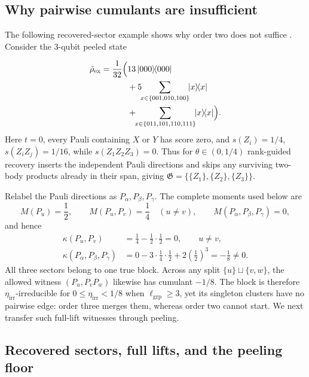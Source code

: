 \documentclass[
  aps,
  prx,
  reprint,
  superscriptaddress,
  amsmath,
  amssymb,
  nofootinbib,
  longbibliography
]{revtex4-2}
\begin{document}
\subsection{Why pairwise cumulants are insufficient}
\label{sec:supp-pairwise-cumulants-insufficient}
The following recovered-sector example shows why order two does not suffice
\cite{smith2020multivariateKstatistics}.  Consider the $3$-qubit peeled
state

\begin{align}
\tilde\rho_{\mathrm{ex}}
=
\frac{1}{32}
\Bigl(
&13\,|000\rangle\!\langle 000|
\notag\\
&+
5\!\!\sum_{x\in\{001,010,100\}}\!\!|x\rangle\!\langle x|
\notag\\
&+
\!\!\sum_{x\in\{011,101,110,111\}}\!\!|x\rangle\!\langle x|
\Bigr).
\label{eq:supp-example-state-three-sectors}
\end{align}
Here $t=0$, every Pauli containing $X$ or $Y$ has score zero, and
$s(Z_i)=1/4$, $s(Z_iZ_j)=1/16$, while $s(Z_1Z_2Z_3)=0$.  Thus for
$\theta\in(0,1/4)$ rank-guided recovery inserts the independent Pauli directions and
skips any surviving two-body products already in their span, giving
$\mathfrak G=\{\{Z_1\},\{Z_2\},\{Z_3\}\}$.

Relabel the Pauli directions as $P_\alpha,P_\beta,P_\gamma$.  The complete moments used
below are
\begin{equation}
M(P_u)=\frac12,
\qquad
M(P_u,P_v)=\frac14\quad(u\ne v),
\qquad
M(P_\alpha,P_\beta,P_\gamma)=0,
\end{equation}
and hence
\begin{align*}
\kappa(P_u,P_v)
&=\frac14-\frac12\cdot\frac12=0,
\qquad u\ne v,\\
\kappa(P_\alpha,P_\beta,P_\gamma)
&=0-3\cdot\frac14\cdot\frac12
+2\left(\frac12\right)^3=-\frac18\ne0.
\end{align*}
All three sectors belong to one true block.  Across any split
$\{u\}\sqcup\{v,w\}$, the allowed witness $(P_u,P_vP_w)$ likewise has
cumulant $-1/8$.  The block is therefore $\eta_{\mathrm{irr}}$-irreducible
for $0\le\eta_{\mathrm{irr}}<1/8$ when $\ell_{\mathrm{grp}}\ge3$, yet its
singleton clusters have no pairwise edge: order three merges them, whereas
order two cannot start.  We next transfer such full-lift witnesses through
peeling.

\subsection{Recovered sectors, full lifts, and the peeling floor}
\label{sec:supp-recovered-blocks-full-lifts-peeling-floor}
\end{document}
